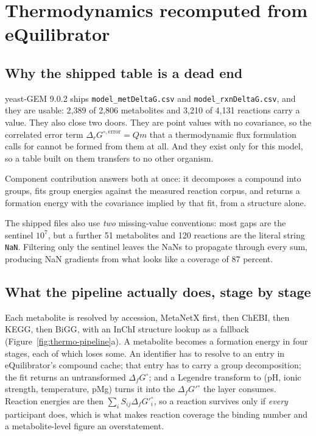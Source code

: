 
\section{Thermodynamics recomputed from eQuilibrator}
\label{sec:thermo}

\subsection{Why the shipped table is a dead end}

yeast-GEM 9.0.2 ships \texttt{model\_metDeltaG.csv} and \texttt{model\_rxnDeltaG.csv}, and
they are usable: 2{,}389 of 2{,}806 metabolites and 3{,}210 of 4{,}131 reactions carry a
value. They also close two doors. They are point values with no covariance, so the
correlated error term $\Delta_r G^{\circ,\mathrm{error}} = Qm$ that a thermodynamic flux
formulation calls for cannot be formed from them at all. And they exist only for this
model, so a table built on them transfers to no other organism.

Component contribution answers both at once: it decomposes a compound into groups, fits
group energies against the measured reaction corpus, and returns a formation energy with
the covariance implied by that fit, from a structure alone.

The shipped files also use \emph{two} missing-value conventions: most gaps are the sentinel
$10^7$, but a further 51 metabolites and 120 reactions are the literal string \texttt{NaN}.
Filtering only the sentinel leaves the NaNs to propagate through every sum, producing NaN
gradients from what looks like a coverage of 87 percent.

\subsection{What the pipeline actually does, stage by stage}

Each metabolite is resolved by accession, MetaNetX first, then ChEBI, then KEGG, then BiGG,
with an InChI structure lookup as a fallback (Figure~\ref{fig:thermo-pipeline}a).
A metabolite becomes a formation energy in four stages, each of which loses some. An
identifier has to resolve to an entry in eQuilibrator's compound cache; that entry has to
carry a group decomposition; the fit returns an untransformed $\Delta_f G^\circ$; and a
Legendre transform to (pH, ionic strength, temperature, pMg) turns it into the
$\Delta_f G'^\circ$ the layer consumes. Reaction energies are then
$\sum_i S_{ij} \Delta_f G'^\circ_i$, so a reaction survives only if \emph{every}
participant does, which is what makes reaction coverage the binding number and a
metabolite-level figure an overstatement.


